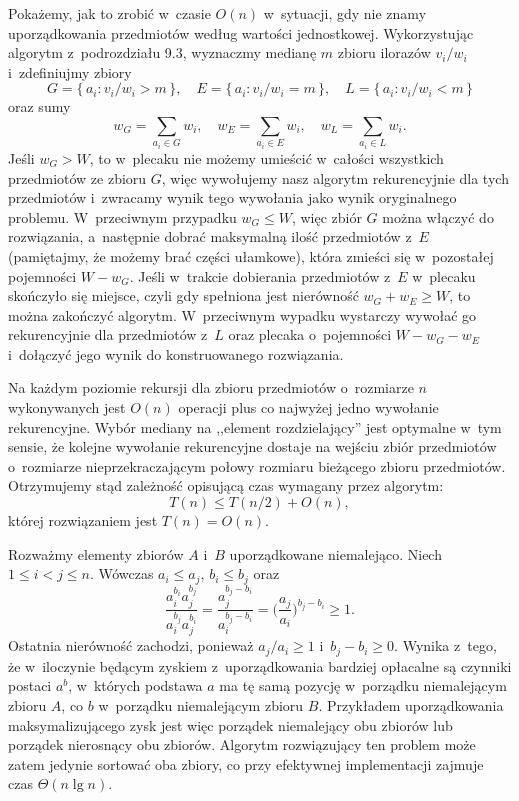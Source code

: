 Pokażemy, jak to zrobić w~czasie $O(n)$ w~sytuacji, gdy nie znamy uporządkowania przedmiotów według wartości jednostkowej.
Wykorzystując algorytm  z~podrozdziału 9.3, wyznaczmy medianę $m$ zbioru ilorazów $v_i/w_i$ i~zdefiniujmy zbiory
\[
	G = \{\,a_i:v_i/w_i>m\,\}, \quad E = \{\,a_i:v_i/w_i=m\,\}, \quad L = \{\,a_i:v_i/w_i<m\,\}
\]
oraz sumy
\[
	w_G = \sum_{a_i\in G}w_i, \quad w_E = \sum_{a_i\in E}w_i, \quad w_L = \sum_{a_i\in L}w_i.
\]
Jeśli $w_G>W$, to w~plecaku nie możemy umieścić w~całości wszystkich przedmiotów ze zbioru $G$, więc wywołujemy nasz algorytm rekurencyjnie dla tych przedmiotów i~zwracamy wynik tego wywołania jako wynik oryginalnego problemu.
W~przeciwnym przypadku $w_G\le W$, więc zbiór $G$ można włączyć do rozwiązania, a~następnie dobrać maksymalną ilość przedmiotów z~$E$ (pamiętajmy, że możemy brać części ułamkowe), która zmieści się w~pozostałej pojemności $W-w_G$.
Jeśli w~trakcie dobierania przedmiotów z~$E$ w~plecaku skończyło się miejsce, czyli gdy spełniona jest nierówność $w_G+w_E\ge W$, to można zakończyć algorytm.
W~przeciwnym wypadku wystarczy wywołać go rekurencyjnie dla przedmiotów z~$L$ oraz plecaka o~pojemności $W-w_G-w_E$ i~dołączyć jego wynik do konstruowanego rozwiązania.

Na każdym poziomie rekursji dla zbioru przedmiotów o~rozmiarze $n$ wykonywanych jest $O(n)$ operacji plus co najwyżej jedno wywołanie rekurencyjne.
Wybór mediany na ,,element rozdzielający'' jest optymalne w~tym sensie, że kolejne wywołanie rekurencyjne dostaje na wejściu zbiór przedmiotów o~rozmiarze nieprzekraczającym połowy rozmiaru bieżącego zbioru przedmiotów.
Otrzymujemy stąd zależność opisującą czas wymagany przez algorytm:
\[
	T(n) \le T(n/2)+O(n),
\]
której rozwiązaniem jest $T(n)=O(n)$.

\exercise %
Rozważmy elementy zbiorów $A$ i~$B$ uporządkowane niemalejąco.
Niech $1\le i<j\le n$.
Wówczas $a_i\le a_j$, $b_i\le b_j$ oraz
\[
	\frac{a_i^{b_i}a_j^{b_j}}{a_i^{b_j}a_j^{b_i}} = \frac{a_j^{b_j-b_i}}{a_i^{b_j-b_i}} = \biggl(\frac{a_j}{a_i}\biggr)^{b_j-b_i} \ge 1.
\]
Ostatnia nierówność zachodzi, ponieważ $a_j/a_i\ge1$ i~$b_j-b_i\ge0$.
Wynika z~tego, że w~iloczynie będącym zyskiem z~uporządkowania bardziej opłacalne są czynniki postaci $a^b$, w~których podstawa $a$ ma tę samą pozycję w~porządku niemalejącym zbioru $A$, co $b$ w~porządku niemalejącym zbioru $B$.
Przykładem uporządkowania maksymalizującego zysk jest więc porządek niemalejący obu zbiorów lub porządek nierosnący obu zbiorów.
Algorytm rozwiązujący ten problem może zatem jedynie sortować oba zbiory, co przy efektywnej implementacji zajmuje czas $\Theta(n\lg n)$.
